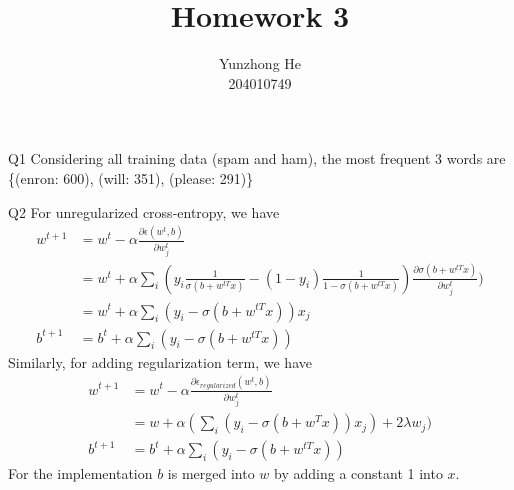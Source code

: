 \documentclass[12pt]{article}
\newenvironment{problem}[2][Problem]{\begin{trivlist}
\item[\hskip \labelsep {\bfseries #1}\hskip \labelsep {\bfseries #2}]}{\end{trivlist}}
\begin{document}
 
 
\title{Homework 3}%
\author{Yunzhong He\\ %
204010749} %
 
\maketitle
 
\begin{problem}{1}
\item{Q1}
Considering all training data (spam and ham), the most frequent 3 words are
\{(enron: 600), (will: 351), (please: 291)\}
\end{problem}

\begin{problem}{2}
\item{Q2}
For unregularized cross-entropy, we have
\begin{align*}
		w^{t+1} &= w^t - \alpha\frac{\partial\epsilon(w^t,b)}{\partial w^t_j} \\
		&= w^t +\alpha\sum_i (y_i \frac{1}{\sigma(b+w^{tT}x)}
		-(1-y_i)\frac{1}{1-\sigma(b+w^{tT}x)}) \frac{\partial\sigma(b+w^{tT}x)}{\partial w^t_j}) \\
		&= w^t +\alpha\sum_i(y_i-\sigma(b+w^{tT}x))x_j \\
		b^{t+1} &= b^t + \alpha\sum_i(y_i-\sigma(b+w^{tT}x))
\end{align*}
Similarly, for adding regularization term, we have
\begin{align*}
		w^{t+1} &= w^t - \alpha\frac{\partial\epsilon_{regularized}(w^t,b)}{\partial w^t_j}\\
		&= w +\alpha(\sum_i(y_i-\sigma(b+w^Tx))x_j) + 2 \lambda w_j)\\
		b^{t+1} &= b^t + \alpha\sum_i(y_i-\sigma(b+w^{tT}x))
\end{align*}
For the implementation $b$ is merged into $w$ by adding a constant 1 into $x$.
\end{problem}
\end{document}
